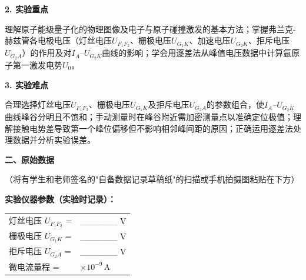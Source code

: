 \documentclass[a4paper,12pt]{article}
\begin{document}
\vspace{0.5cm}

{\fontsize{14pt}{20pt}\selectfont \textbf{2. 实验重点}}

\vspace{0.3cm}

{\fontsize{12pt}{18pt}\selectfont

理解原子能级量子化的物理图像及电子与原子碰撞激发的基本方法；掌握弗兰克-赫兹管各电极电压（灯丝电压$U_{F_1F_2}$、栅极电压$U_{G_1K}$、加速电压$U_{G_2K}$、拒斥电压$U_{G_2A}$）的作用及对$I_A$--$U_{G_2K}$曲线的影响；学会用逐差法从峰值电压数据中计算氩原子第一激发电势$U_0$。

}

\vspace{0.5cm}

{\fontsize{14pt}{20pt}\selectfont \textbf{3. 实验难点}}

\vspace{0.3cm}

{\fontsize{12pt}{18pt}\selectfont

合理选择灯丝电压$U_{F_1F_2}$、栅极电压$U_{G_1K}$及拒斥电压$U_{G_2A}$的参数组合，使$I_A$--$U_{G_2K}$曲线峰谷分明且不饱和；手动测量时在峰谷附近需加密测量点以准确定位极值；理解接触电势差导致第一个峰位偏移但不影响相邻峰间距的原因；正确运用逐差法处理数据并分析实验误差。

}

\newpage

{\fontsize{16pt}{24pt}\selectfont \textbf{二、原始数据}}

\vspace{0.3cm}
{\fontsize{12pt}{18pt}\selectfont （将有学生和老师签名的"自备数据记录草稿纸"的扫描或手机拍摄图粘贴在下方）}

\vspace{0.5cm}


{\fontsize{12pt}{18pt}\selectfont \textbf{实验仪器参数（实验时记录）：}}

\vspace{0.3cm}

{\fontsize{11pt}{16pt}\selectfont
\begin{tabular}{ll}
    灯丝电压 $U_{F_1F_2}$ = & \_\_\_\_\_\_ V \\[0.5em]
    栅极电压 $U_{G_1K}$ = & \_\_\_\_\_\_ V \\[0.5em]
    拒斥电压 $U_{G_2A}$ = & \_\_\_\_\_\_ V \\[0.5em]
    微电流量程 = & $\times 10^{-9}$\,A \\
\end{tabular}
}
\end{document}
